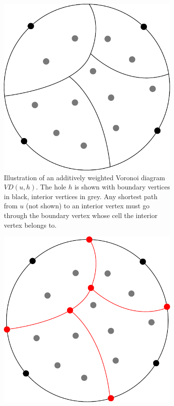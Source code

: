 \begin{figure}
  \centering
  \begin{subfigure}[b]{0.45\textwidth}
    \includegraphics[width=\textwidth]{figs/awvd1.pdf}
    \caption{Illustration of an additively weighted Voronoi diagram $VD(u,h)$. The hole
    $h$ is shown with boundary vertices in black, interior vertices in grey. Any shortest path
  from $u$ (not shown) to an interior vertex must go through the boundary vertex whose
cell the interior vertex belongs to.}
    \label{awvd1}
  \end{subfigure}
  \quad
  \begin{subfigure}[b]{0.45\textwidth}
    \includegraphics[width=\textwidth]{figs/awvd2.pdf}

\end{subfigure}
\end{figure}
